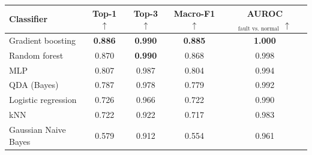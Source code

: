 \begin{tabular}{lcccc}
\toprule
Classifier & Top-1 $\uparrow$ & Top-3 $\uparrow$ & Macro-F1 $\uparrow$ & AUROC$_{\text{fault vs.\ normal}}$ $\uparrow$ \\
\midrule
Gradient boosting & \cellcolor{gray!20}\textbf{0.886} & \cellcolor{gray!20}\textbf{0.990} & \cellcolor{gray!20}\textbf{0.885} & \cellcolor{gray!20}\textbf{1.000} \\
Random forest & 0.870 & \cellcolor{gray!20}\textbf{0.990} & 0.868 & 0.998 \\
MLP & 0.807 & 0.987 & 0.804 & 0.994 \\
QDA (Bayes) & 0.787 & 0.978 & 0.779 & 0.992 \\
Logistic regression & 0.726 & 0.966 & 0.722 & 0.990 \\
kNN & 0.722 & 0.922 & 0.717 & 0.983 \\
Gaussian Naive Bayes & 0.579 & 0.912 & 0.554 & 0.961 \\
\bottomrule
\end{tabular}
